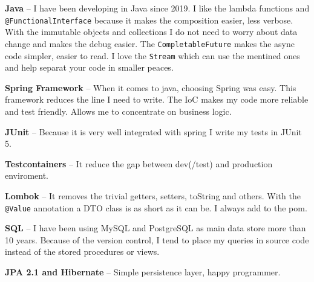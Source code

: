 \documentclass[9pt]{developercv} %
\begin{document}
\begin{minipage}[t]{0.49\textwidth}
	\vspace{-\baselineskip} %


	\textbf{Java} -- I have been developing in Java since 2019.
		I like the lambda functions and \texttt{@FunctionalInterface} because it makes the composition easier, less verbose.
		With the immutable objects and collections I do not need to worry about data change and makes the debug easier.
		The \texttt{CompletableFuture} makes the async code simpler, easier to read.
		I love the \texttt{Stream} which can use the mentined ones and help separat your code in smaller peaces.

	\textbf{Spring Framework} -- When it comes to java, choosing Spring was easy.
	This framework reduces the line I need to write. 
	The IoC makes my code more reliable and test friendly. Allows me to concentrate on business logic.
	

	\textbf{JUnit} -- Because it is very well integrated with spring I write my tests in JUnit 5.

	\textbf{Testcontainers} -- It reduce the gap between dev(/test) and production enviroment.

	\textbf{Lombok} -- It removes the trivial getters, setters, toString and others. With the \texttt{@Value} annotation a DTO class is as short as it can be. I always add to the pom.

	\textbf{SQL} -- I have been using MySQL and PostgreSQL as main data store more than 10 years.
	Because of the version control, I tend to place my queries in source code instead of the stored procedures or views.

	\textbf{JPA 2.1 and Hibernate} -- Simple persistence layer, happy programmer.

\end{minipage}

\end{document}
